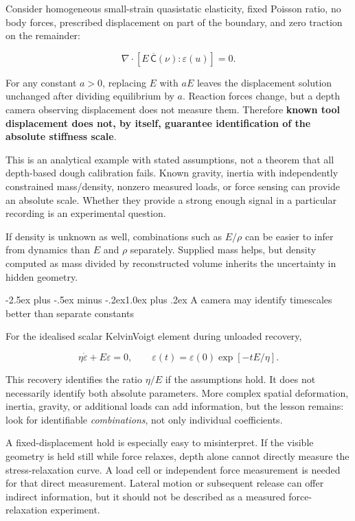 \documentclass[
  11pt,
]{article}
\makeatletter
\renewcommand\subsection{\needspace{5\baselineskip}\@startsection{subsection}{2}{\z@}%
  {-2.5ex plus -.5ex minus -.2ex}{1.0ex plus .2ex}%
  {\normalfont\sffamily\large\bfseries\color{accent}}}
\makeatother
\begin{document}
Consider homogeneous small-strain quasistatic elasticity, fixed Poisson
ratio, no body forces, prescribed displacement on part of the boundary,
and zero traction on the remainder:

\[
\nabla\cdot\left[E\,\overline{\mathsf C}(\nu):\varepsilon(u)\right]=0.
\]

For any constant \(a>0\), replacing \(E\) with \(aE\) leaves the
displacement solution unchanged after dividing equilibrium by \(a\).
Reaction forces change, but a depth camera observing displacement does
not measure them. Therefore \textbf{known tool displacement does not, by
itself, guarantee identification of the absolute stiffness scale}.

This is an analytical example with stated assumptions, not a theorem
that all depth-based dough calibration fails. Known gravity, inertia
with independently constrained mass/density, nonzero measured loads, or
force sensing can provide an absolute scale. Whether they provide a
strong enough signal in a particular recording is an experimental
question.

If density is unknown as well, combinations such as \(E/\rho\) can be
easier to infer from dynamics than \(E\) and \(\rho\) separately.
Supplied mass helps, but density computed as mass divided by
reconstructed volume inherits the uncertainty in hidden geometry.

\subsection{A camera may identify timescales better than separate
constants}\label{a-camera-may-identify-timescales-better-than-separate-constants}

For the idealised scalar Kelvin\textendash{}\allowbreak{}Voigt element
during unloaded recovery,

\[
\eta\dot\varepsilon+E\varepsilon=0,
\qquad
\varepsilon(t)=\varepsilon(0)\exp[-tE/\eta].
\]

This recovery identifies the ratio \(\eta/E\) if the assumptions hold.
It does not necessarily identify both absolute parameters. More complex
spatial deformation, inertia, gravity, or additional loads can add
information, but the lesson remains: look for identifiable
\emph{combinations}, not only individual coefficients.

A fixed-displacement hold is especially easy to misinterpret. If the
visible geometry is held still while force relaxes, depth alone cannot
directly measure the stress-relaxation curve. A load cell or independent
force measurement is needed for that direct measurement. Lateral motion
or subsequent release can offer indirect information, but it should not
be described as a measured force-relaxation experiment.
\end{document}

